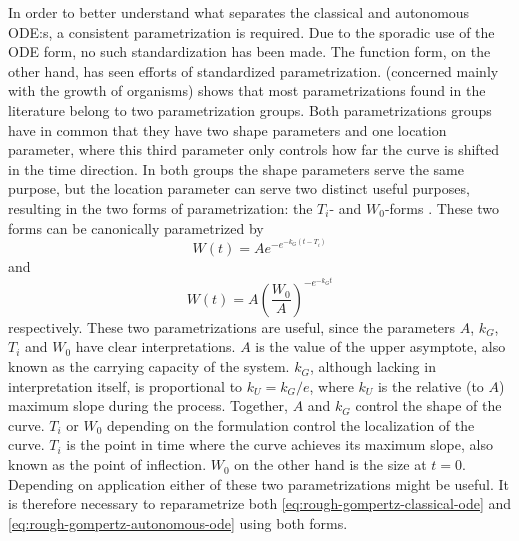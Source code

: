 In order to better understand what separates the classical and autonomous ODE:s, a consistent parametrization is required.
Due to the sporadic use of the ODE form, no such standardization has been made.
The function form, on the other hand, has seen efforts of standardized parametrization.
\cite{tjorve2017gompertz} (concerned mainly with the growth of organisms) shows that most parametrizations found in the literature belong to two parametrization groups.
Both parametrizations groups have in common that they have two shape parameters and one location parameter, where this third parameter only controls how far the curve is shifted in the time direction.
In both groups the shape parameters serve the same purpose, but the location parameter can serve two distinct useful purposes, resulting in the two forms of parametrization: the \(T_i\)- and \(W_0\)-forms \cite{tjorve2017gompertz}.
These two forms can be canonically parametrized by
\begin{equation} \label{eq:gompertz-ti-function}
  W(t) = A e^{-e^{-k_G(t-T_i)}}
\end{equation}
and
\begin{equation} \label{eq:gompertz-w0-function}
  W(t) = A \left(\frac{W_0}{A}\right)^{-e^{-k_G t}}
\end{equation}
respectively.
These two parametrizations are useful, since the parameters \(A\), \(k_G\), \(T_i\) and \(W_0\) have clear interpretations. %
\(A\) is the value of the upper asymptote, also known as the carrying capacity of the system.
\(k_G\), although lacking in interpretation itself, is proportional to \(k_U = k_G / e\), where \(k_U\) is the relative (to \(A\)) maximum slope during the process.
Together, \(A\) and \(k_G\) control the shape of the curve.
\(T_i\) or \(W_0\) depending on the formulation control the localization of the curve.
\(T_i\) is the point in time where the curve achieves its maximum slope, also known as the point of inflection.
\(W_0\) on the other hand is the size at \(t=0\).
Depending on application either of these two parametrizations might be useful.
It is therefore necessary to reparametrize both \cref{eq:rough-gompertz-classical-ode} and \cref{eq:rough-gompertz-autonomous-ode} using both forms.


